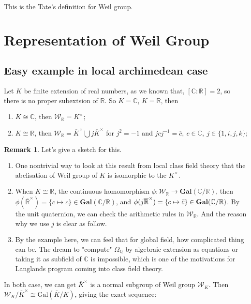 \documentclass[12pt,a4paper,english]{article}
\theoremstyle{definition}
\newtheorem*{rem}{Remark}
\theoremstyle{plain}
\begin{document}
This is the Tate's definition for Weil group.





\section{Representation of Weil Group}
\subsection{Easy example in local archimedean case}


Let $K$ be finite extension of real numbers, as we known that, $[\mathbb{C}:\mathbb{R}]=2$, so there is no proper subextsion of $\mathbb{R}$. So $K=\mathbb{C}$, $K=\mathbb{R}$, then
\begin{enumerate}
    \item $K\cong \mathbb{C}$, then $\mathcal{W}_{\mathbb{R}}=K^{\times}$;
    \item $K\cong \mathbb{R}$, then $\mathcal{W}_{\mathbb{R}}= \overline{K}^{\times}\bigcup j\overline{K}^{\times}$ for $j^{2}=-1$ and $jcj^{-1}=\overline{c},\ c\in \mathbb{C},\ j\in\{1,i,j,k\}$;
\end{enumerate}
\begin{rem}
Let's give a sketch for this.

\begin{enumerate}
    \item 

One nontrivial way to look at this result from local class field theory that the abelisation of Weil group of $K$ is isomorphic to the $K^{\times}$. 
\item When $K\cong\mathbb{R}$, the continuous homomorphism $\phi:\mathcal{W}_{\mathbb{R}}\rightarrow\textbf{Gal}(\mathbb{C}/\mathbb{R})$, then $\phi(\overline{\mathbb{R}}^{\times})=\{c\mapsto c\}\in\textbf{Gal}(\mathbb{C}/\mathbb{R})$, and $\phi(j\overline{\mathbb{R}}^{\times})=\{c\mapsto \Bar{c}\}\in \textbf{Gal}(\mathbb{C}/\mathbb{R})$. By the unit quaternion, we can check the arithmetic rules in $\mathcal{W}_{\mathbb{R}}$.
And the reason why we use $j$ is  clear as follow.
\item By the example here, we can feel that for global field, how complicated thing can be. The dream to "compute" $\Omega_{\mathbb{Q}}$ by algebraic extension as equations or taking it as subfield of $\mathbb{C}$ is impossible, which is one of the motivations for Langlands program coming into class field theory.
\end{enumerate}


\end{rem}
In both case, we can get $\overline{K}^{\times}$ is a normal subgroup of Weil group $\mathcal{W}_{K}$. Then $\mathcal{W}_{K}/\overline{K}^{\times}\cong \text{Gal}(\overline{K}/K)$, giving the exact sequence:
\begin{center}
\end{center}
\end{document}
